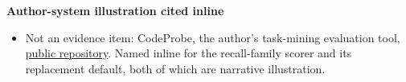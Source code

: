 \textbf{Author-system illustration cited inline}

\begin{itemize}
\tightlist
\item
  Not an evidence item: CodeProbe, the author's task-mining evaluation tool, \href{https://github.com/sjarmak/codeprobe}{public repository}. Named inline for the recall-family scorer and its replacement default, both of which are narrative illustration.
\end{itemize}

